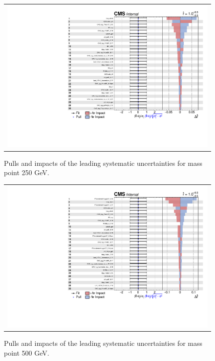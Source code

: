 \begin{figure}[hbt!]
  \centering
  \begin{tabular}{c}
      \includegraphics[width=0.9\linewidth]{figures/Impact/MX250_MH125.pdf} \\
  \end{tabular}
\caption{Pulls and impacts of the leading systematic uncertainties for mass point 250 GeV.
}
\label{fig:impacts_0}
\end{figure}

\begin{figure}[hbt!]
  \centering
  \begin{tabular}{c}
      \includegraphics[width=0.9\linewidth]{figures/Impact/MX500_MH125.pdf} \\
  \end{tabular}
\caption{Pulls and impacts of the leading systematic uncertainties for mass point 500 GeV.
}
\label{fig:impacts_1}
\end{figure}


